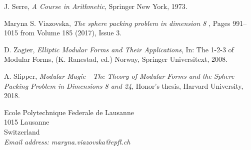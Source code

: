 \begin{thebibliography}{20}
 {\sc J. Serre}, {\em A Course in Arithmetic}, Springer New York, 1973.




 {\sc Maryna S. Viazovska}, {\em The sphere packing problem in dimension 8	},
Pages 991--1015 from Volume 185 (2017), Issue 3.

 {\sc D. Zagier}, {\em Elliptic Modular Forms and Their Applications}, In:  The 1-2-3 of Modular Forms, (K. Ranestad, ed.) Norway, Springer Universitext, 2008.

 {\sc A. Slipper}, {\em Modular Magic - The Theory of Modular Forms and the Sphere Packing Problem in Dimensions 8 and 24}, Honor's thesis, Harvard University, 2018.
\end{thebibliography}

\newpage

{\footnotesize
\noindent
Ecole Polytechnique Federale de Lausanne\\
1015 Lausanne\\
Switzerland\\
{\it Email address: maryna.viazovska@epfl.ch}}
